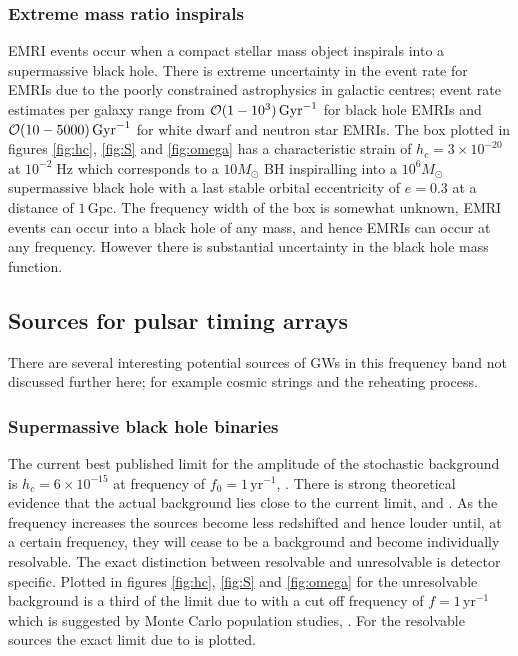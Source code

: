 \documentclass[fleqn,12pt]{iopart}
\newcommand{\Msun}{\ensuremath{M_{ \odot }}}
\begin{document}
\subsubsection{Extreme mass ratio inspirals}
EMRI events occur when a compact stellar mass object inspirals into a supermassive black hole. There is extreme uncertainty in the event rate for EMRIs due to the poorly constrained astrophysics in galactic centres; event rate estimates per galaxy range from ${\cal{O}}(1-10^{3})\,\textrm{Gyr}^{-1}$ for black hole EMRIs and ${\cal{O}}(10-5000)\,\textrm{Gyr}^{-1}$ for white dwarf and neutron star EMRIs. The box plotted in figures \ref{fig:hc}, \ref{fig:S} and \ref{fig:omega} has a characteristic strain of $h_{c}=3\times 10^{-20}$ at $10^{-2}\;\textrm{Hz}$ which corresponds to a $10\Msun$ BH inspiralling into a $10^{6}\Msun$ supermassive black hole with a last stable orbital eccentricity of $e=0.3$ at a distance of $1\,\textrm{Gpc}$. The frequency width of the box is somewhat unknown, EMRI events can occur into a black hole of any mass, and hence EMRIs can occur at any frequency. However there is substantial uncertainty in the black hole mass function.




\subsection{Sources for pulsar timing arrays}
There are several interesting potential sources of GWs in this frequency band not discussed further here; for example cosmic strings and the reheating process.

\subsubsection{Supermassive black hole binaries}
The current best published limit for the amplitude of the stochastic background is $h_{c}=6\times 10^{-15}$ at frequency of $f_{0}=1\,\textrm{yr}^{-1}$, \cite{Haasteren}. There is strong theoretical evidence that the actual background lies close to the current limit, \cite{imminentdetectionofgravitationalwaves} and \cite{NONimminentdetectionofgravitationalwaves}. As the frequency increases the sources become less redshifted and hence louder until, at a certain frequency, they will cease to be a background and become individually resolvable. The exact distinction between resolvable and unresolvable is detector specific. Plotted in figures \ref{fig:hc}, \ref{fig:S} and \ref{fig:omega} for the unresolvable background is a third of the limit due to \cite{Haasteren} with a cut off frequency of $f=1\,\textrm{yr}^{-1}$ which is suggested by Monte Carlo population studies, \cite{SesanaVecchioColancino}. For the resolvable sources the exact limit due to \cite{Haasteren} is plotted.
\end{document}

